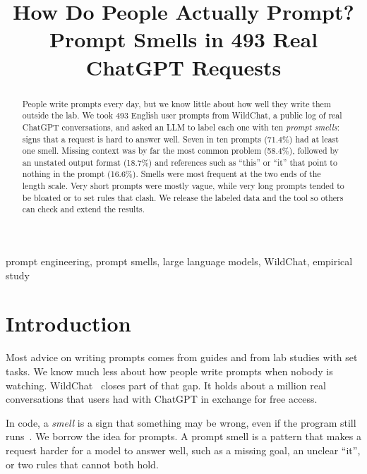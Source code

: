 \documentclass[conference]{IEEEtran}
\begin{document}
\title{How Do People Actually Prompt? Prompt Smells in 493 Real ChatGPT Requests}

\author{
}

\maketitle

\begin{abstract}
People write prompts every day, but we know little about how well they write them
outside the lab. We took 493 English user prompts from WildChat, a public log of
real ChatGPT conversations, and asked an LLM to label each one with ten
\emph{prompt smells}: signs that a request is hard to answer well. Seven in ten
prompts (71.4\%) had at least one smell. Missing context was by far the most common
problem (58.4\%), followed by an unstated output format (18.7\%) and references
such as ``this'' or ``it'' that point to nothing in the prompt (16.6\%). Smells
were most frequent at the two ends of the length scale. Very short prompts were
mostly vague, while very long prompts tended to be bloated or to set rules that
clash. We release the labeled data and the tool so others can check and extend
the results.
\end{abstract}

\begin{IEEEkeywords}
prompt engineering, prompt smells, large language models, WildChat, empirical study
\end{IEEEkeywords}

\section{Introduction}
Most advice on writing prompts comes from guides and from lab studies with set tasks.
We know much less about how people write prompts when nobody is watching.
WildChat~\cite{wildchat} closes part of that gap. It holds about a million real
conversations that users had with ChatGPT in exchange for free access.

In code, a \emph{smell} is a sign that something may be wrong, even if the program
still runs~\cite{fowler}. We borrow the idea for prompts. A prompt smell is a
pattern that makes a request harder for a model to answer well, such as a missing
goal, an unclear ``it'', or two rules that cannot both hold.
\end{document}

